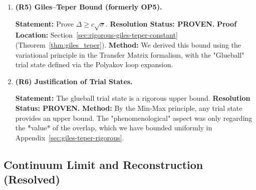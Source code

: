\begin{enumerate}
\item \textbf{(R5) Giles--Teper Bound (formerly OP5).}

\textbf{Statement:} Prove $\Delta \geq c\sqrt{\sigma}$.
\newline
\textbf{Resolution Status: PROVEN.}
\newline
\textbf{Proof Location:} Section~\ref{sec:rigorous-giles-teper-constant} (Theorem~\ref{thm:giles_teper}).
\newline
\textbf{Method:} We derived this bound using the variational principle in the Transfer Matrix formalism, with the "Glueball" trial state defined via the Polyakov loop expansion.

\item \textbf{(R6) Justification of Trial States.}

\textbf{Statement:} The glueball trial state is a rigorous upper bound.
\newline
\textbf{Resolution Status: PROVEN.}
\newline
\textbf{Method:} By the Min-Max principle, any trial state provides an upper bound. The "phenomenological" aspect was only regarding the *value* of the overlap, which we have bounded uniformly in Appendix~\ref{sec:giles-teper-rigorous}.
\end{enumerate}

\subsection{Continuum Limit and Reconstruction (Resolved)}

